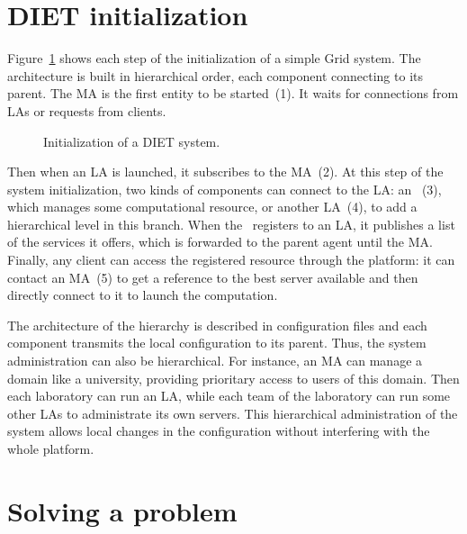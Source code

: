 \section{DIET initialization}
\label{init}

Figure~\ref{fig:init} shows each step of the initialization of a simple Grid
system. The architecture is built in hierarchical order, each component
connecting to its parent. The MA is the first entity to be started~(1). It waits
for connections from LAs or requests from clients.

\begin{figure}[hbt]
  \begin{center}
    \caption{Initialization of a DIET system.}
    \label{fig:init}
  \end{center}
\end{figure}

Then when an LA is launched, it subscribes to the MA~(2). At this step of the
system initialization, two kinds of components can connect to the LA: an
\sed ~(3), which manages some computational resource, or another LA~(4), to add a
hierarchical level in this branch. When the \sed\ registers to an LA, it
publishes a list of the services it offers, which is forwarded to the parent
agent until the MA.
Finally, any client can access the registered resource through the platform: it
can contact an MA~(5) to get a reference to the best server available and then
directly connect to it to launch the computation.

The architecture of the hierarchy is described in configuration files and each
component transmits the local configuration to its parent. Thus, the system
administration can also be hierarchical. For instance, an MA can manage a domain
like a university, providing prioritary access to users of this domain. Then
each laboratory can run an LA, while each team of the laboratory can run some
other LAs to administrate its own servers. This hierarchical administration of
the system allows local changes in the configuration without interfering with
the whole platform.



\section{Solving a problem}
\label{sec:solvepb}

